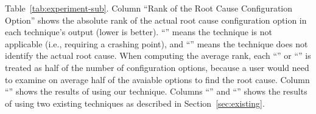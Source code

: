 \begin{table*}[t]
{{Table~\ref{tab:experiment-sub}. 
Column ``Rank of the Root Cause Configuration Option'' shows the
absolute rank of the actual root
cause configuration option in each technique's output (lower is better).
``\x'' means the technique is not applicable (i.e., requiring a crashing
point), and ``\n'' means the technique does not identify the actual root cause.
When computing the average rank, each ``\x'' or ``\n'' is treated as
half of the number of configuration options, because a user would need to examine
on average half of the avaiable options to find the root cause.
Column ``\ourtool'' shows the results
of using our technique. Columns ``\prevtool'' and ``\conftool'' shows
the results of using two existing techniques as described in Section~\ref{sec:existing}.
}
}
\end{table*}
